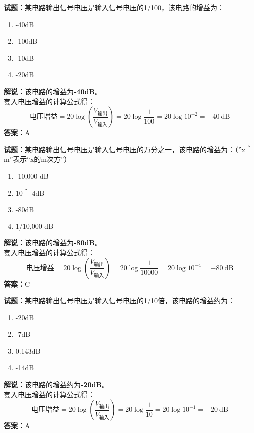 \documentclass{ctexbook}
\begin{document}
\bigskip

\noindent\textbf{试题：}某电路输出信号电压是输入信号电压的1/100，该电路的增益为：
\begin{enumerate}[leftmargin=3em]
  \item -40dB
  \item -100dB
  \item -10dB
  \item -20dB
\end{enumerate}
\noindent\textbf{解说：}该电路的增益为\textbf{-40dB}。\\
套入电压增益的计算公式得：
$$\mbox{电压增益}=20 \log \left( {\frac{V_{ \mbox{输出} }}{V_{ \mbox{输入} }}} \right)=20 \log \frac{1}{100}=20 \log 10^{-2}= -40 \ \mathrm{dB}$$
\noindent\textbf{答案：}A

\bigskip

\noindent\textbf{试题：}某电路输出信号电压是输入信号电压的万分之一，该电路的增益为：（”x＾m”表示“x的m次方”）
\begin{enumerate}[leftmargin=3em]
  \item -10,000 dB
  \item 10＾-4dB
  \item -80dB
  \item 1/10,000 dB
\end{enumerate}
\noindent\textbf{解说：}该电路的增益为\textbf{-80dB}。\\
套入电压增益的计算公式得：
$$\mbox{电压增益}=20 \log \left( {\frac{V_{ \mbox{输出} }}{V_{ \mbox{输入} }}} \right)=20 \log \frac{1}{10000}=20 \log 10^{-4}= -80 \ \mathrm{dB}$$
\noindent\textbf{答案：}C

\bigskip

\noindent\textbf{试题：}某电路输出信号电压是输入信号电压的1/10倍，该电路的增益约为：
\begin{enumerate}[leftmargin=3em]
  \item -20dB
  \item -7dB
  \item 0.143dB
  \item -14dB
\end{enumerate}
\noindent\textbf{解说：}该电路的增益约为\textbf{-20dB}。\\
套入电压增益的计算公式得：
$$\mbox{电压增益}=20 \log \left( {\frac{V_{ \mbox{输出} }}{V_{ \mbox{输入} }}} \right)=20 \log \frac{1}{10}=20 \log 10^{-1}= -20 \ \mathrm{dB}$$
\noindent\textbf{答案：}A

\bigskip
\end{document}
